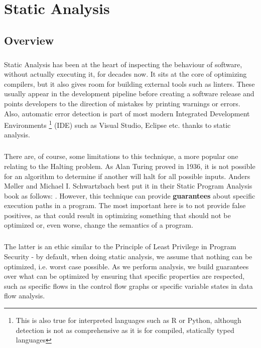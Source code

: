\chapter{Static Analysis}

\section*{Overview}
\paragraph*{}
Static Analysis has been at the heart of inspecting the behaviour of software, without actually executing it, for decades now. It sits at the core of optimizing compilers, but it also gives room for building external tools such as linters. These usually appear in the development pipeline before creating a software release and points developers to the direction of mistakes by printing warnings or errors. Also, automatic error detection is part of most modern Integrated Development Environments \footnote{This is also true for interpreted languages such as R or Python, although detection is not as comprehensive as it is for compiled, statically typed languages} (IDE) such as Visual Studio, Eclipse etc. thanks to static analysis.

\paragraph*{}
There are, of course, some limitations to this technique, a more popular one relating to the Halting problem. As Alan Turing proved in 1936, it is not possible for an algorithm to determine if another will halt for all possible inputs. Anders Møller and Michael I. Schwartzbach best put it in their Static Program Analysis book as follows: \cite[automated reasoning of software generally must involve approximation]{static-program-analysis}. However, this technique can provide \textbf{guarantees} about specific execution paths in a program. The most important here is to not provide false positives, as that could result in optimizing something that should not be optimized or, even worse, change the semantics of a program.

\paragraph*{}
The latter is an ethic similar to the Principle of Least Privilege in Program Security - by default, when doing static analysis, we assume that nothing can be optimized, i.e. worst case possible. As we perform analysis, we build guarantees over what can be optimized by ensuring that specific properties are respected, such as specific flows in the control flow graphs or specific variable states in data flow analysis.

